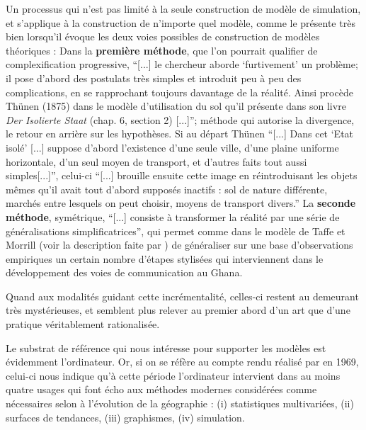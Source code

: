 Un processus qui n'est pas limité à la seule construction de modèle de simulation, et s'applique à la construction de n'importe quel modèle, comme le présente très bien \textcite[32-33]{Haggett1965} lorsqu'il évoque les deux voies possibles de construction de modèles théoriques : Dans la \textbf{première méthode}, que l'on pourrait qualifier de complexification progressive, \enquote{[...] le chercheur aborde \enquote{furtivement} un problème; il pose d'abord des postulats très simples et introduit peu à peu des complications, en se rapprochant toujours davantage de la réalité. Ainsi procède Thünen (1875) dans le modèle d'utilisation du sol qu'il présente dans son livre \textit{Der Isolierte Staat} (chap. 6, section 2) [...]}; méthode qui autorise la divergence, le retour en arrière sur les hypothèses. Si au départ Thünen \enquote{[...] Dans cet \enquote{Etat isolé} [...] suppose d'abord l'existence d'une seule ville, d'une plaine uniforme horizontale, d'un seul moyen de transport, et d'autres faits tout aussi simples[...]}, celui-ci \enquote{[...] brouille ensuite cette image en réintroduisant les objets mêmes qu'il avait tout d'abord supposés inactifs : sol de nature différente, marchés entre lesquels on peut choisir, moyens de transport divers.} La \textbf{seconde méthode}, symétrique, \enquote{[...] consiste à transformer la réalité par une série de généralisations simplificatrices}, qui permet comme dans le modèle de Taffe et Morrill (voir la description faite par \textcite[93-96]{Haggett1965}) de généraliser sur une base d'observations empiriques un certain nombre d'étapes stylisées qui interviennent dans le développement des voies de communication au Ghana.

Quand aux modalités guidant cette incrémentalité, celles-ci restent au demeurant très mystérieuses, et semblent plus relever au premier abord d'un art \autocite{Tocher1963, Axelrod1997} que d'une pratique véritablement rationalisée.

Le substrat de référence qui nous intéresse pour supporter les modèles est évidemment l'ordinateur. Or, si on se réfère au compte rendu réalisé par \textcite{Haggett1969} en 1969, celui-ci nous indique qu'à cette période l'ordinateur intervient dans au moins quatre usages qui font écho aux méthodes modernes considérées comme nécessaires selon \textcite{Claval1977} à l'évolution  de la géographie : (i) statistiques multivariées, (ii) surfaces de tendances, (iii) graphismes, (iv) simulation. 

